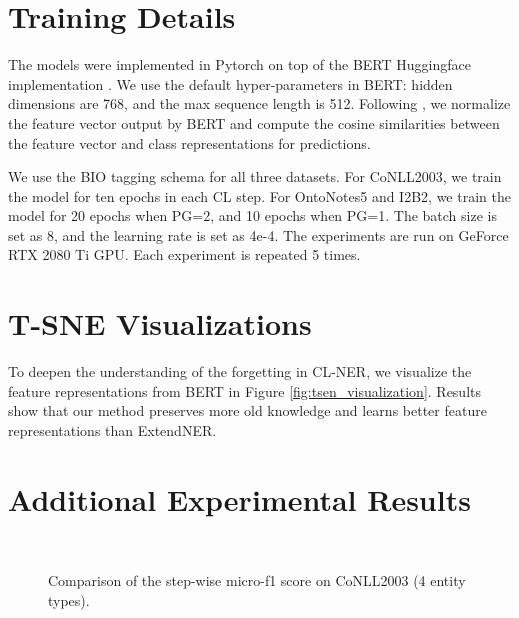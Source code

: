 \documentclass[11pt]{article}
\begin{document}
\section{Training Details \label{appendix:training_details}}

The models were implemented in Pytorch \cite{paszke2019pytorch} on top of the BERT Huggingface implementation \cite{wolf2019huggingface}.
We use the default hyper-parameters in BERT: hidden dimensions are 768, and the max sequence length is 512.
Following \citet{hu2021distilling}, we normalize the feature vector output by BERT and compute the cosine similarities between the feature vector and class representations for predictions.

We use the BIO tagging schema for all three datasets.
For CoNLL2003, we train the model for ten epochs in each CL step.
For OntoNotes5 and I2B2, we train the model for 20 epochs when PG=2, and 10 epochs when PG=1.
The batch size is set as 8, and the learning rate is set as 4e-4.
The experiments are run on GeForce RTX 2080 Ti GPU.
Each experiment is repeated 5 times.


\section{T-SNE Visualizations\label{appendix:tsne_visualization}}
To deepen the understanding of the forgetting in CL-NER, we visualize the feature representations from BERT in Figure \ref{fig:tsen_visualization}.
Results show that our method preserves more old knowledge and learns better feature representations than ExtendNER.

\section{Additional Experimental Results\label{appendix:additional_results}}

\begin{figure}[h]
    \centering
    \\
    \caption{Comparison of the step-wise micro-f1 score on CoNLL2003 (4 entity types).}
    \label{fig:main_result_step_2}
\end{figure}
\end{document}
